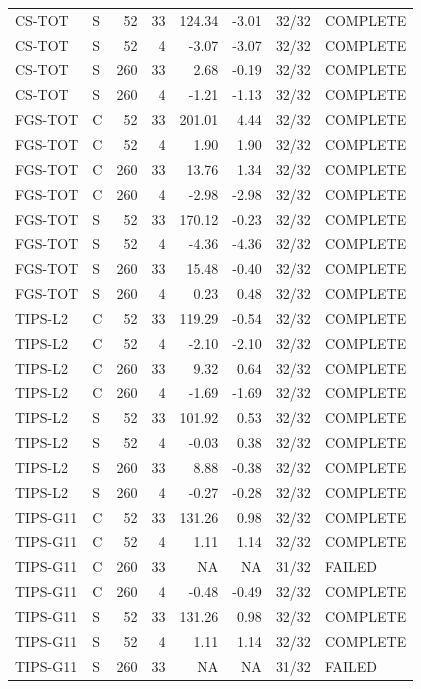 \begin{longtable}{llrrrrrl}
CS-TOT & S & 52 & 33 & 124.34 & -3.01 & 32/32 & COMPLETE \\
CS-TOT & S & 52 & 4 & -3.07 & -3.07 & 32/32 & COMPLETE \\
CS-TOT & S & 260 & 33 & 2.68 & -0.19 & 32/32 & COMPLETE \\
CS-TOT & S & 260 & 4 & -1.21 & -1.13 & 32/32 & COMPLETE \\
FGS-TOT & C & 52 & 33 & 201.01 & 4.44 & 32/32 & COMPLETE \\
FGS-TOT & C & 52 & 4 & 1.90 & 1.90 & 32/32 & COMPLETE \\
FGS-TOT & C & 260 & 33 & 13.76 & 1.34 & 32/32 & COMPLETE \\
FGS-TOT & C & 260 & 4 & -2.98 & -2.98 & 32/32 & COMPLETE \\
FGS-TOT & S & 52 & 33 & 170.12 & -0.23 & 32/32 & COMPLETE \\
FGS-TOT & S & 52 & 4 & -4.36 & -4.36 & 32/32 & COMPLETE \\
FGS-TOT & S & 260 & 33 & 15.48 & -0.40 & 32/32 & COMPLETE \\
FGS-TOT & S & 260 & 4 & 0.23 & 0.48 & 32/32 & COMPLETE \\
TIPS-L2 & C & 52 & 33 & 119.29 & -0.54 & 32/32 & COMPLETE \\
TIPS-L2 & C & 52 & 4 & -2.10 & -2.10 & 32/32 & COMPLETE \\
TIPS-L2 & C & 260 & 33 & 9.32 & 0.64 & 32/32 & COMPLETE \\
TIPS-L2 & C & 260 & 4 & -1.69 & -1.69 & 32/32 & COMPLETE \\
TIPS-L2 & S & 52 & 33 & 101.92 & 0.53 & 32/32 & COMPLETE \\
TIPS-L2 & S & 52 & 4 & -0.03 & 0.38 & 32/32 & COMPLETE \\
TIPS-L2 & S & 260 & 33 & 8.88 & -0.38 & 32/32 & COMPLETE \\
TIPS-L2 & S & 260 & 4 & -0.27 & -0.28 & 32/32 & COMPLETE \\
TIPS-G11 & C & 52 & 33 & 131.26 & 0.98 & 32/32 & COMPLETE \\
TIPS-G11 & C & 52 & 4 & 1.11 & 1.14 & 32/32 & COMPLETE \\
TIPS-G11 & C & 260 & 33 & NA & NA & 31/32 & FAILED \\
TIPS-G11 & C & 260 & 4 & -0.48 & -0.49 & 32/32 & COMPLETE \\
TIPS-G11 & S & 52 & 33 & 131.26 & 0.98 & 32/32 & COMPLETE \\
TIPS-G11 & S & 52 & 4 & 1.11 & 1.14 & 32/32 & COMPLETE \\
TIPS-G11 & S & 260 & 33 & NA & NA & 31/32 & FAILED \\

\end{longtable}
